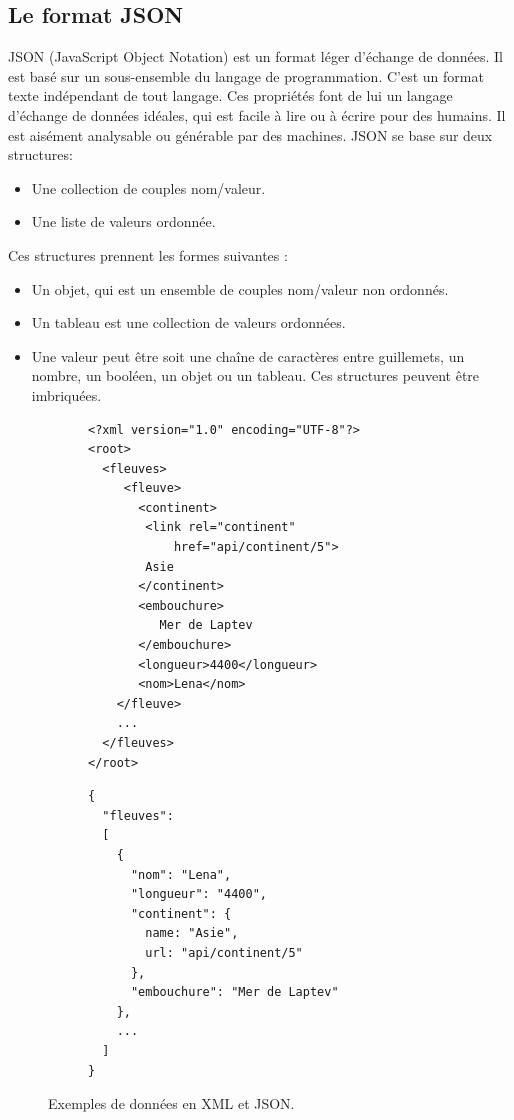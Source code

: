 \subsection{Le format JSON}
JSON (JavaScript Object Notation) est un format léger d'échange de données. Il est basé sur un sous-ensemble du langage de programmation. C’est un format texte indépendant de tout langage.
Ces propriétés font de lui un langage d'échange de données idéales, qui est facile à lire ou à écrire pour des humains. Il est aisément analysable ou générable par des machines. 
JSON se base sur deux structures:
\begin{itemize}
	
	\item Une collection de couples nom/valeur. 
	\item Une liste de valeurs ordonnée. 
\end{itemize}
Ces structures prennent les formes suivantes :
\begin{itemize}
	\item Un objet, qui est un ensemble de couples nom/valeur non ordonnés. 
	\item Un tableau est une collection de valeurs ordonnées. 
	\item Une valeur peut être soit une chaîne de caractères entre guillemets, un nombre, un booléen, un objet ou un tableau. Ces structures peuvent être imbriquées.
	      
\end{itemize}

\lstset{style=JSON}

\begin{figure}[h!]
  \centering
  \begin{subfigure}[b]{0.52\linewidth}
      \begin{lstlisting}[caption=Exemple en XML]
<?xml version="1.0" encoding="UTF-8"?>
<root>
  <fleuves>
     <fleuve>
       <continent>
        <link rel="continent" 
       		href="api/continent/5">
       	Asie
       </continent>
       <embouchure>
          Mer de Laptev
       </embouchure>
       <longueur>4400</longueur>
       <nom>Lena</nom>
    </fleuve>
    ...
  </fleuves>
</root>
\end{lstlisting}
  \end{subfigure}\hfill%
  \begin{subfigure}[b]{0.40\linewidth}
      \begin{lstlisting}[caption=Equivalent en JSON]
{
  "fleuves":
  [
    {
      "nom": "Lena",
      "longueur": "4400",
      "continent": {
      	name: "Asie",
      	url: "api/continent/5"
      },
      "embouchure": "Mer de Laptev"
    },
    ...
  ]
}       
\end{lstlisting}
\end{subfigure}\hfill%
\caption{Exemples de données en XML et JSON.}
\label{ref:JSONXML}
\end{figure}



